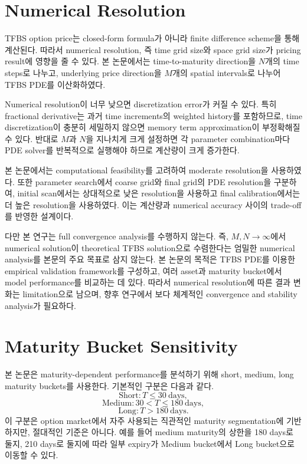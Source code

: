 \documentclass[11pt,a4paper]{report}
\begin{document}
\section{Numerical Resolution}

TFBS option price는 closed-form formula가 아니라 finite difference scheme을 통해 계산된다. 따라서 numerical resolution, 즉 time grid size와 space grid size가 pricing result에 영향을 줄 수 있다. 본 논문에서는 time-to-maturity direction을 $N$개의 time steps로 나누고, underlying price direction을 $M$개의 spatial intervals로 나누어 TFBS PDE를 이산화하였다.

Numerical resolution이 너무 낮으면 discretization error가 커질 수 있다. 특히 fractional derivative는 과거 time increments의 weighted history를 포함하므로, time discretization이 충분히 세밀하지 않으면 memory term approximation이 부정확해질 수 있다. 반대로 $M$과 $N$을 지나치게 크게 설정하면 각 parameter combination마다 PDE solver를 반복적으로 실행해야 하므로 계산량이 크게 증가한다.

본 논문에서는 computational feasibility를 고려하여 moderate resolution을 사용하였다. 또한 parameter search에서 coarse grid와 final grid의 PDE resolution을 구분하여, initial scan에서는 상대적으로 낮은 resolution을 사용하고 final calibration에서는 더 높은 resolution을 사용하였다. 이는 계산량과 numerical accuracy 사이의 trade-off를 반영한 설계이다.

다만 본 연구는 full convergence analysis를 수행하지 않는다. 즉, $M,N\to\infty$에서 numerical solution이 theoretical TFBS solution으로 수렴한다는 엄밀한 numerical analysis를 본문의 주요 목표로 삼지 않는다. 본 논문의 목적은 TFBS PDE를 이용한 empirical validation framework를 구성하고, 여러 asset과 maturity bucket에서 model performance를 비교하는 데 있다. 따라서 numerical resolution에 따른 결과 변화는 limitation으로 남으며, 향후 연구에서 보다 체계적인 convergence and stability analysis가 필요하다.

\section{Maturity Bucket Sensitivity}

본 논문은 maturity-dependent performance를 분석하기 위해 short, medium, long maturity buckets를 사용한다. 기본적인 구분은 다음과 같다.
\[
\text{Short}: T\le 30\ \text{days},
\]
\[
\text{Medium}: 30<T\le 180\ \text{days},
\]
\[
\text{Long}: T>180\ \text{days}.
\]
이 구분은 option market에서 자주 사용되는 직관적인 maturity segmentation에 기반하지만, 절대적인 기준은 아니다. 예를 들어 medium maturity의 상한을 180 days로 둘지, 210 days로 둘지에 따라 일부 expiry가 Medium bucket에서 Long bucket으로 이동할 수 있다.
\end{document}
